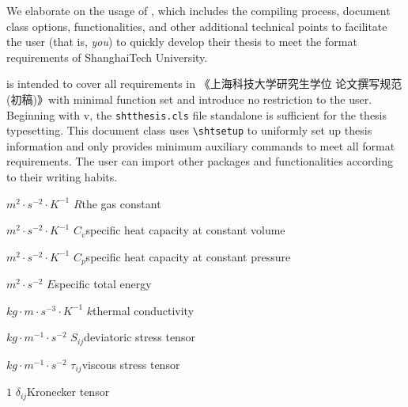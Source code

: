 \documentclass[
  fontset = mac,
]{shtthesis}
\begin{document}
\maketitle

\frontmatter
\begin{abstract}
  这篇文档阐述 \shtthesis 的使用方法，包括文档编译方式、文档类选项、文档类提供的功能及其他便于用户（\emph{也就是正在阅读这篇文档的您}）快速撰写符合上海科技大学要求的学位论文的技术要点。

  \shtthesis 旨在以最简实现和最小依赖完整覆盖《上海科技大学研究生学位论文撰写规范（初稿）》的所有格式需求，且不为用户额外设限。从 v\version 起，仅需单个 \verb|shtthesis.cls| 文件即可满足排版需求。文档通过 \verb|\shtsetup| 命令统一设定学位论文信息，且仅提供满足格式需求的最少额外命令。用户可根据自身撰文习惯，引入额外的宏包和命令完成学位论文撰写。
\end{abstract}

\begin{abstract*}
  We elaborate on the usage of \shtthesis, which includes the compiling process, document class options, functionalities, and other additional technical points to facilitate the user (that is, \emph{you}) to quickly develop their thesis to meet the format requirements of ShanghaiTech University. 

  \shtthesis is intended to cover all requirements in 《上海科技大学研究生学位 论文撰写规范(初稿)》with minimal function set and introduce no restriction to the user. Beginning with v\version, the \verb|shtthesis.cls| file standalone is suﬀicient for the thesis typesetting. This document class uses \verb|\shtsetup| to uniformly set up thesis information and only provides minimum auxiliary commands to meet all format requirements. The user can import other packages and functionalities according to their writing habits. 
\end{abstract*}

\makeindices

\begin{nomenclatures}
  \item[${m^{2} \cdot s^{-2} \cdot K^{-1}}$]{$R$}{the gas constant}
  \item[${m^{2} \cdot s^{-2} \cdot K^{-1}}$]{$C_v$}{specific heat capacity at constant volume}
  \item[${m^{2} \cdot s^{-2} \cdot K^{-1}}$]{$C_p$}{specific heat capacity at constant pressure}
  \item[${m^{2} \cdot s^{-2}}$]{$E$}{specific total energy}
  \item[${kg \cdot m \cdot s^{-3} \cdot K^{-1}}$]{$k$}{thermal conductivity}
  \item[${kg \cdot m^{-1} \cdot s^{-2}}$]{$S_{ij}$}{deviatoric stress tensor}
  \item[${kg \cdot m^{-1} \cdot s^{-2}}$]{$\tau_{ij}$}{viscous stress tensor}
  \item[${1}$]{$\delta_{ij}$}{Kronecker tensor}
\end{nomenclatures}
\end{document}
